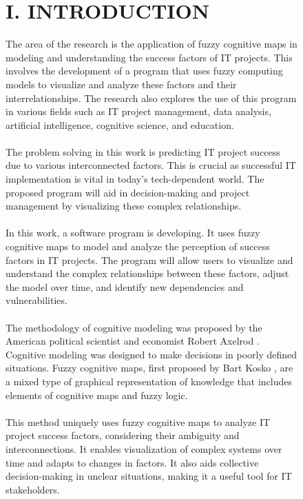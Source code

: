 \documentclass{article}
\begin{document}
\begin{figure}[!t]
\begin{minipage}{0.49\textwidth}
\begin{center}
                \chapter{I. INTRODUCTION}
            \end{center}
            The area of the research is the application of fuzzy cognitive maps in modeling and understanding the success factors of IT projects. This involves the development of a program that uses fuzzy computing models to visualize and analyze these factors and their interrelationships. The research also explores the use of this program in various fields such as IT project management, data analysis, artificial intelligence, cognitive science, and education.\\
            ~\\
            The problem solving in this work is predicting IT project success due to various interconnected factors. This is crucial as successful IT implementation is vital in today's tech-dependent world. The proposed program will aid in decision-making and project management by visualizing these complex relationships.\\
            ~\\
            In this work, a software program is developing. It uses fuzzy cognitive maps to model and analyze the perception of success factors in IT projects. The program will allow users to visualize and understand the complex relationships between these factors, adjust the model over time, and identify new dependencies and vulnerabilities.\\
            ~\\
            The methodology of cognitive modeling was proposed by the American political scientist and economist Robert Axelrod \cite{litlink12}. Cognitive modeling was designed to make decisions in poorly defined situations. Fuzzy cognitive maps, first proposed by Bart Kosko \cite{litlink13}, are a mixed type of graphical representation of knowledge that includes elements of cognitive maps and fuzzy logic.\\
            ~\\
            This method uniquely uses fuzzy cognitive maps to analyze IT project success factors, considering their ambiguity and interconnections. It enables visualization of complex systems over time and adapts to changes in factors. It also aids collective decision-making in unclear situations, making it a useful tool for IT stakeholders.\\
            ~\\

\end{minipage}
\end{figure}
\end{document}
